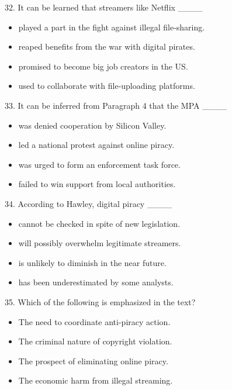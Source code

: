 \documentclass[UTF8,11pt]{ctexart}
\begin{document}
32. It can be learned that streamers like Netflix \_\_\_\_


\begin{itemize}[leftmargin=2em,itemsep=.2em,topsep=.4em]\item[A.] played a part in the fight against illegal file-sharing.
\item[B.] reaped benefits from the war with digital pirates.
\item[C.] promised to become big job creators in the US.
\item[D.] used to collaborate with file-uploading platforms.
\end{itemize}

33. It can be inferred from Paragraph 4 that the MPA \_\_\_\_


\begin{itemize}[leftmargin=2em,itemsep=.2em,topsep=.4em]\item[A.] was denied cooperation by Silicon Valley.
\item[B.] led a national protest against online piracy.
\item[C.] was urged to form an enforcement task force.
\item[D.] failed to win support from local authorities.
\end{itemize}

34. According to Hawley, digital piracy \_\_\_\_


\begin{itemize}[leftmargin=2em,itemsep=.2em,topsep=.4em]\item[A.] cannot be checked in spite of new legislation.
\item[B.] will possibly overwhelm legitimate streamers.
\item[C.] is unlikely to diminish in the near future.
\item[D.] has been underestimated by some analysts.
\end{itemize}

35. Which of the following is emphasized in the text?


\begin{itemize}[leftmargin=2em,itemsep=.2em,topsep=.4em]\item[A.] The need to coordinate anti-piracy action.
\item[B.] The criminal nature of copyright violation.
\item[C.] The prospect of eliminating online piracy.
\item[D.] The economic harm from illegal streaming.
\end{itemize}
\end{document}
